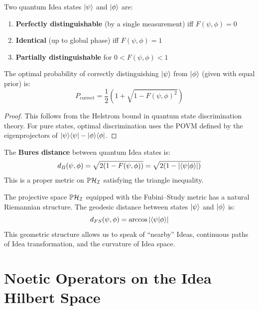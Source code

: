 \begin{theorem}
\label{thm:fidelity-distinguish}
Two quantum Idea states $|\psi\rangle$ and $|\phi\rangle$ are:
\begin{enumerate}
  \item \textbf{Perfectly distinguishable} (by a single measurement) iff $F(\psi,\phi) = 0$
  \item \textbf{Identical} (up to global phase) iff $F(\psi,\phi) = 1$
  \item \textbf{Partially distinguishable} for $0 < F(\psi,\phi) < 1$
\end{enumerate}
The optimal probability of correctly distinguishing $|\psi\rangle$ from $|\phi\rangle$ (given with equal prior) is:
\[
P_{\mathrm{correct}} = \frac{1}{2}\left(1 + \sqrt{1 - F(\psi,\phi)^2}\right)
\]
\end{theorem}

\begin{proof}
This follows from the Helstrom bound in quantum state discrimination theory. For pure states, optimal discrimination uses the POVM defined by the eigenprojectors of $|\psi\rangle\langle \psi| - |\phi\rangle\langle \phi|$.
\end{proof}

\begin{definition}
\label{def:idea-distance}
The \textbf{Bures distance} between quantum Idea states is:
\[
d_B(\psi, \phi) = \sqrt{2(1 - F(\psi, \phi))} = \sqrt{2(1 - |\langle \psi | \phi \rangle|)}
\]
This is a proper metric on $\mathbb{P}\mathcal{H}_{\mathcal{I}}$ satisfying the triangle inequality.
\end{definition}

\begin{remark}
\label{rem:geometric}
The projective space $\mathbb{P}\mathcal{H}_{\mathcal{I}}$ equipped with the Fubini--Study metric has a natural Riemannian structure. The geodesic distance between states $|\psi\rangle$ and $|\phi\rangle$ is:
\[
d_{FS}(\psi, \phi) = \arccos|\langle \psi | \phi \rangle|
\]
This geometric structure allows us to speak of ``nearby'' Ideas, continuous paths of Idea transformation, and the curvature of Idea space.
\end{remark}

\section{Noetic Operators on the Idea Hilbert Space}
\label{sec:noetic-ops-idea-hilbert}

